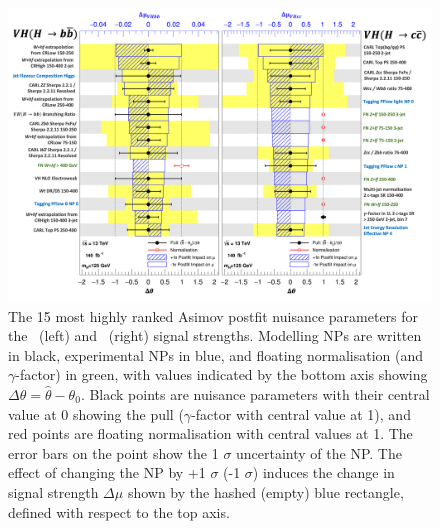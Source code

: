 \begin{figure}[h!]
    \centering
    \includegraphics[width=\textwidth]{Images/VH/Fit/fromSlides/ranking.png}
    \caption{The 15 most highly ranked Asimov postfit nuisance parameters for the \vhb\ (left) and \vhc\ (right) signal strengths. Modelling NPs are written in black, experimental NPs in blue, and floating normalisation (and $\gamma$-factor) in green, with values indicated by the bottom axis showing $\Delta \theta = \hat{\theta} - \theta_0$. Black points are nuisance parameters with their central value at 0 showing the pull ($\gamma$-factor with central value at 1), and red points are floating normalisation with central values at 1. The error bars on the point show the 1 $\sigma$ uncertainty of the NP. The effect of changing the NP by +1 $\sigma$ (-1 $\sigma$) induces the change in signal strength $\Delta\mu$ shown by the hashed (empty) blue rectangle, defined with respect to the top axis.}
    \label{fig:rankingPostfit}
\end{figure} 

